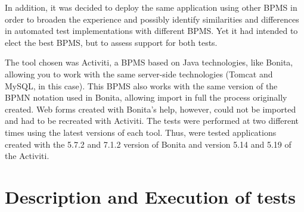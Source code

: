 \documentclass[runningheads,a4paper]{llncs}
\begin{document}
In addition, it was decided to deploy the same application using other BPMS in order to broaden the experience and possibly identify similarities and differences in automated test implementations with different BPMS. Yet it had intended to elect the best BPMS, but to assess support for both tests.

The tool chosen was Activiti, a BPMS based on Java technologies, like Bonita, allowing you to work with the same server-side technologies (Tomcat and MySQL, in this case). This BPMS also works with the same version of the BPMN notation used in Bonita, allowing import in full the process originally created. Web forms created with Bonita's help, however, could not be imported and had to be recreated with Activiti. The tests were performed at two different times using the latest versions of each tool. Thus, were tested applications created with the 5.7.2 and 7.1.2 version of Bonita and version  5.14 and 5.19 of the Activiti. 

\section{Description and Execution of tests}\label{s:testes}
\end{document}
